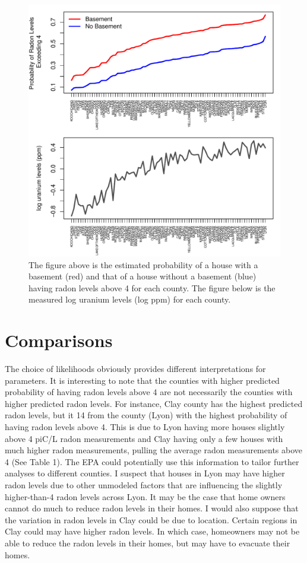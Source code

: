 \documentclass{article}
\def\beginmyfig{\begin{figure}[htbp]\begin{center}}
\def\endmyfig{\end{center}\end{figure}}
\begin{document}
\beginmyfig \includegraphics[scale=.5]{images/pm.pdf}  
            \caption{The figure above is the estimated probability of a house
            with a basement (red) and that of a house without a basement
            (blue) having radon levels above 4 for each county. The figure
            below is the measured log uranium levels (log ppm) for each
            county.}\endmyfig 

\section*{Comparisons}
The choice of likelihoods obviously provides different interpretations for
parameters. It is interesting to note that the counties with higher predicted
probability of having radon levels above 4 are not necessarily the counties
with higher predicted radon levels. For instance, Clay county has the highest
predicted radon levels, but it 14 from the county (Lyon) with the highest
probability of having radon levels above 4. This is due to Lyon having more
houses slightly above 4 piC/L radon measurements and Clay having only a few
houses with much higher radon measurements, pulling the average radon
measurements above 4 (See Table 1). The EPA could potentially use this
information to tailor further analyses to different counties. I suspect that
houses in Lyon may have higher radon levels due to other unmodeled factors that
are influencing the slightly higher-than-4 radon levels across Lyon. It may be
the case that home owners cannot do much to reduce radon levels in their homes.
I would also suppose that the variation in radon levels in Clay could be due to
location. Certain regions in Clay could may have higher radon levels. In which
case, homeowners may not be able to reduce the radon levels in their homes, but
may have to evacuate their homes.\\
\end{document}

